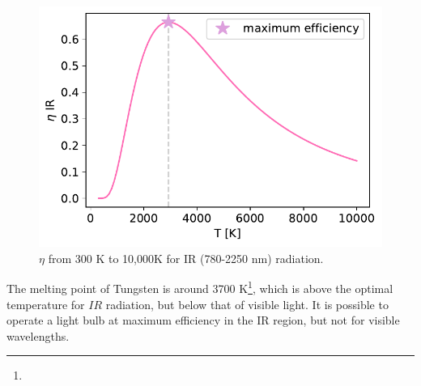 \documentclass{article}
\begin{document}
\begin{enumerate}
\begin{enumerate}
  \begin{figure}[h]
    \centering 
    \captionsetup{margin=3.2cm}
    \includegraphics[width=0.5\linewidth]{Q2d.pdf}
    \caption{\label{fig:2d} $\eta$ from 300 K to 10,000K for IR (780-2250 nm) radiation.}
  \end{figure}

  The melting point of Tungsten is around 3700 K\footnote{}, which is above the optimal temperature for $IR$ radiation, but below that of visible light. 
  It is possible to operate a light bulb at maximum efficiency in the IR region, but not for visible wavelengths.
\end{enumerate}


\end{enumerate}
\end{document}
